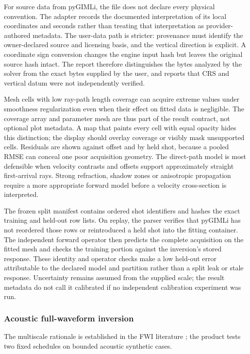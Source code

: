 For source data from pyGIMLi, the file does not declare every physical
convention. The adapter records the documented interpretation of its
local coordinates and seconds rather than treating that interpretation
as provider-authored metadata. The user-data path is stricter: provenance
must identify the owner-declared source and licensing basis, and the
vertical direction is explicit. A coordinate sign conversion changes
the engine input hash but leaves the original source hash intact. The
report therefore distinguishes the bytes analyzed by the solver from
the exact bytes supplied by the user, and reports that CRS and vertical
datum were not independently verified.

Mesh cells with low ray-path length coverage can acquire extreme values
under smoothness regularization even when their effect on fitted data is
negligible. The coverage array and parameter mesh are thus part of the
result contract, not optional plot metadata. A map that paints every
cell with equal opacity hides this distinction; the display should
overlay coverage or visibly mask unsupported cells. Residuals are shown
against offset and by held shot, because a pooled RMSE can conceal one
poor acquisition geometry. The direct-path model is most defensible
when velocity contrasts and offsets support approximately straight
first-arrival rays. Strong refraction, shadow zones or anisotropic
propagation require a more appropriate forward model before a velocity
cross-section is interpreted.

The frozen split manifest contains ordered shot identifiers and hashes
the exact training and held-out row lists. On replay, the parser verifies
that pyGIMLi has not reordered those rows or reintroduced a held shot
into the fitting container. The independent forward operator then
predicts the complete acquisition on the fitted mesh and checks the
training portion against the inversion's stored response. These identity
and operator checks make a low held-out error attributable to the
declared model and partition rather than a split leak or stale response.
Uncertainty remains assumed from the supplied scale; the result metadata do
not call it calibrated if no independent calibration experiment was run.

\subsubsection{Acoustic full-waveform inversion}

The multiscale rationale is established in the FWI literature \cite{bunks1995}; the product tests two fixed schedules on bounded acoustic synthetic cases.\label{method-fwi}

